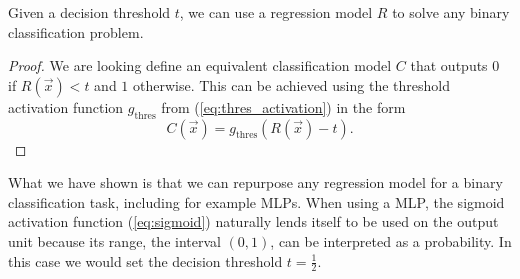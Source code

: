 \begin{lemma}
    Given a decision threshold $t$, we can use a regression model $R$ to solve any binary classification problem.
\end{lemma}
\begin{proof}
    We are looking define an equivalent classification model $C$ that outputs $0$ if $R\left(\vec{x}\right)<t$ and $1$ otherwise. 
    This can be achieved using the threshold activation function $g_\text{thres}$ from (\ref{eq:thres_activation}) in the form
    \begin{equation}
        C(\vec{x}) = g_\text{thres}\left(R\left(\vec{x}\right) - t\right).
    \end{equation}
\end{proof}
\begin{remark}
    What we have shown is that we can repurpose any regression model for a binary classification task, including for example MLPs.
    When using a MLP, the sigmoid activation function (\ref{eq:sigmoid}) naturally lends itself to be used on the output unit because its range, the interval $(0,1)$, can be interpreted as a probability.
    In this case we would set the decision threshold $t=\frac{1}{2}$.
\end{remark}

